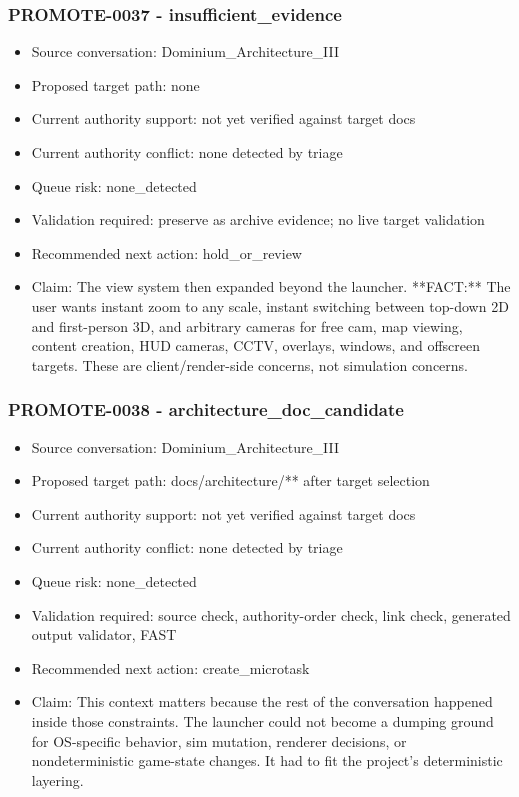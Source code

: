 \documentclass[11pt,a4paper]{report}
\begin{document}
\subsubsection{PROMOTE-0037 - insufficient\_evidence}

\begin{itemize}
\item Source conversation: Dominium\_Architecture\_III
\item Proposed target path: none
\item Current authority support: not yet verified against target docs
\item Current authority conflict: none detected by triage
\item Queue risk: none\_detected
\item Validation required: preserve as archive evidence; no live target validation
\item Recommended next action: hold\_or\_review
\item Claim: The view system then expanded beyond the launcher. **FACT:** The user wants instant zoom to any scale, instant switching between top-down 2D and first-person 3D, and arbitrary cameras for free cam, map viewing, content creation, HUD cameras, CCTV, overlays, windows, and offscreen targets. These are client/render-side concerns, not simulation concerns.
\end{itemize}

\subsubsection{PROMOTE-0038 - architecture\_doc\_candidate}

\begin{itemize}
\item Source conversation: Dominium\_Architecture\_III
\item Proposed target path: docs/architecture/** after target selection
\item Current authority support: not yet verified against target docs
\item Current authority conflict: none detected by triage
\item Queue risk: none\_detected
\item Validation required: source check, authority-order check, link check, generated output validator, FAST
\item Recommended next action: create\_microtask
\item Claim: This context matters because the rest of the conversation happened inside those constraints. The launcher could not become a dumping ground for OS-specific behavior, sim mutation, renderer decisions, or nondeterministic game-state changes. It had to fit the project's deterministic layering.
\end{itemize}
\end{document}
